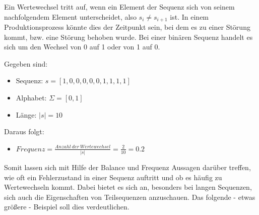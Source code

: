 Ein Wertewechsel tritt auf, wenn ein Element der Sequenz sich von seinem nachfolgendem Element unterscheidet, also $s_{i} \neq s_{i+1}$ ist. In einem Produktionsprozess könnte dies der Zeitpunkt sein, bei dem es zu einer Störung kommt, bzw. eine Störung behoben wurde. Bei einer binären Sequenz handelt es sich um den Wechsel von 0 auf 1 oder von 1 auf 0.

\begin{theorem}
Gegeben sind:
\begin{itemize}[noitemsep]
	\item Sequenz: $s = [1,0,0,0,0,0,1,1,1,1]$
	\item Alphabet: $\Sigma = [0,1]$
	\item Länge: $|s| = 10$
\end{itemize}
Daraus folgt:
\begin{itemize}[noitemsep]
	\item [] $Frequenz = \frac{Anzahl\ der\ Wertewechsel}{|s|} = \frac{2}{10} = 0.2$
\end{itemize}
\end{theorem}

Somit lassen sich mit Hilfe der Balance und Frequenz Aussagen darüber treffen, wie oft ein Fehlerzustand in einer Sequenz auftritt und ob es häufig zu Wertewechseln kommt. Dabei bietet es sich an, besonders bei langen Sequenzen, sich auch die Eigenschaften von Teilsequenzen anzuschauen. Das folgende - etwas größere - Beispiel soll dies verdeutlichen.

